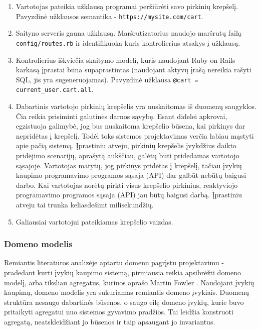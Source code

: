 \begin{enumerate}
  \item Vartotojas pateikia užklausą programai peržiūrėti savo pirkinių krepšelį. Pavyzdinė užklausos semantika - \lstinline|https://mysite.com/cart|.

  \item Saityno serveris gauna užklausą. Maršrutizatorius naudojo maršrutų failą \lstinline|config/routes.rb| ir identifikuoka kuris kontrolierius atsakys į užklausą.

  \item Kontrolierius iškviečia skaitymo modelį, kuris naudojant Ruby on Rails karkasą įprastai būna supaprastintas (naudojant aktyvų įrašą nereikia rašyti SQL, jis yra sugeneruojamas). Pavyzdinė užklausa \lstinline|@cart = current_user.cart.all|.

  \item Dabartinis vartotojo pirkinių krepšelis yra nuskaitomas iš duomenų saugyklos. Čia reikia prisiminti galutinės darnos sąvybę. Esant didelei apkrovai, egzistuoja galimybė, jog bus nuskaitoma krepšelio būsena, kai pirkinys dar nepridėtas į krepšelį. Todėl toks sistemos projektavimas verčia labiau mąstyti apie pačią sistemą. Įprastiniu atveju, pirkinių krepšelis įvykdžius daikto pridėjimo scenarijų, aprašytą aukščiau, galėtų būti pridedamas vartotojo sąsajoje. Vartotojas matytų, jog pirkinys pridėtas į krepšelį, tačiau įvykių kaupimo programavimo programos sąsaja (API) dar galbūt nebūtų baigusi darbo. Kai vartotojas norėtų pirkti visus krepšelio pirkinius, reaktyviojo programavimo programos sąsaja (API) jau būtų baigusi darbą. Įprastiniu atveju tai trunka keliasdešimt milisekundžių.

  \item Galiausiai vartotojui pateikiamas krepšelio vaizdas.
\end{enumerate}

\subsubsection{Domeno modelis}

Remiantis literatūros analizėje aptartu domenu pagrįstu projektavimu - pradedant kurti įvykių kaupimo sistemą, pirmiausia reikia apsibrėžti domeno modelį, arba tiksliau agregatus, kuriuos aprašo Martin Fowler \cite{Fowler:Aggregate}. Naudojant įvykių kaupimą, domeno modelis yra sukuriamas remiantis domeno įvykiais. Duomenų struktūra nesaugo dabartinės būsenos, o saugo eilę domeno įvykių, kurie buvo pritaikyti agregatui nuo sistemos gyvavimo pradžios. Tai leidžia konstruoti agregatą, neatskleidžiant jo būsenos ir taip apsaugant jo invariantus.

